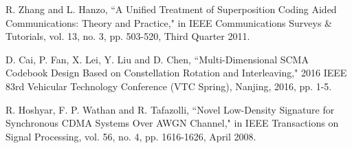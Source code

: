 \documentclass[conference]{IEEEtran}
\begin{document}
\begin{thebibliography}{100}
R. Zhang and L. Hanzo, ``A Unified Treatment of Superposition Coding Aided Communications: Theory and Practice," in IEEE Communications Surveys \& Tutorials, vol. 13, no. 3, pp. 503-520, Third Quarter 2011.

D. Cai, P. Fan, X. Lei, Y. Liu and D. Chen, ``Multi-Dimensional SCMA Codebook Design Based on Constellation Rotation and Interleaving," 2016 IEEE 83rd Vehicular Technology Conference (VTC Spring), Nanjing, 2016, pp. 1-5.

R. Hoshyar, F. P. Wathan and R. Tafazolli, ``Novel Low-Density Signature for Synchronous CDMA Systems Over AWGN Channel," in IEEE Transactions on Signal Processing, vol. 56, no. 4, pp. 1616-1626, April 2008.
\end{thebibliography}




\end{document}
